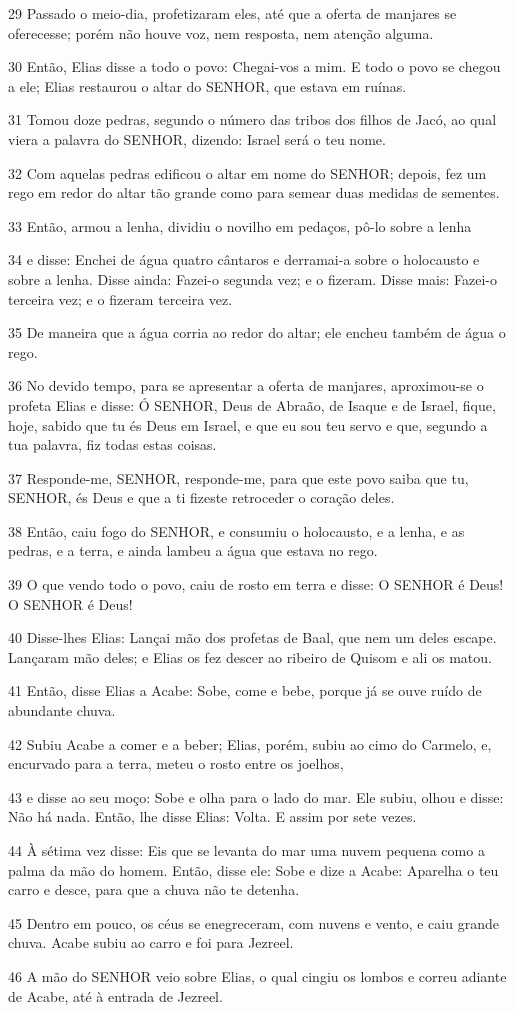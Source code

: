 \par 29 Passado o meio-dia, profetizaram eles, até que a oferta de manjares se oferecesse; porém não houve voz, nem resposta, nem atenção alguma.
\par 30 Então, Elias disse a todo o povo: Chegai-vos a mim. E todo o povo se chegou a ele; Elias restaurou o altar do SENHOR, que estava em ruínas.
\par 31 Tomou doze pedras, segundo o número das tribos dos filhos de Jacó, ao qual viera a palavra do SENHOR, dizendo: Israel será o teu nome.
\par 32 Com aquelas pedras edificou o altar em nome do SENHOR; depois, fez um rego em redor do altar tão grande como para semear duas medidas de sementes.
\par 33 Então, armou a lenha, dividiu o novilho em pedaços, pô-lo sobre a lenha
\par 34 e disse: Enchei de água quatro cântaros e derramai-a sobre o holocausto e sobre a lenha. Disse ainda: Fazei-o segunda vez; e o fizeram. Disse mais: Fazei-o terceira vez; e o fizeram terceira vez.
\par 35 De maneira que a água corria ao redor do altar; ele encheu também de água o rego.
\par 36 No devido tempo, para se apresentar a oferta de manjares, aproximou-se o profeta Elias e disse: Ó SENHOR, Deus de Abraão, de Isaque e de Israel, fique, hoje, sabido que tu és Deus em Israel, e que eu sou teu servo e que, segundo a tua palavra, fiz todas estas coisas.
\par 37 Responde-me, SENHOR, responde-me, para que este povo saiba que tu, SENHOR, és Deus e que a ti fizeste retroceder o coração deles.
\par 38 Então, caiu fogo do SENHOR, e consumiu o holocausto, e a lenha, e as pedras, e a terra, e ainda lambeu a água que estava no rego.
\par 39 O que vendo todo o povo, caiu de rosto em terra e disse: O SENHOR é Deus! O SENHOR é Deus!
\par 40 Disse-lhes Elias: Lançai mão dos profetas de Baal, que nem um deles escape. Lançaram mão deles; e Elias os fez descer ao ribeiro de Quisom e ali os matou.
\par 41 Então, disse Elias a Acabe: Sobe, come e bebe, porque já se ouve ruído de abundante chuva.
\par 42 Subiu Acabe a comer e a beber; Elias, porém, subiu ao cimo do Carmelo, e, encurvado para a terra, meteu o rosto entre os joelhos,
\par 43 e disse ao seu moço: Sobe e olha para o lado do mar. Ele subiu, olhou e disse: Não há nada. Então, lhe disse Elias: Volta. E assim por sete vezes.
\par 44 À sétima vez disse: Eis que se levanta do mar uma nuvem pequena como a palma da mão do homem. Então, disse ele: Sobe e dize a Acabe: Aparelha o teu carro e desce, para que a chuva não te detenha.
\par 45 Dentro em pouco, os céus se enegreceram, com nuvens e vento, e caiu grande chuva. Acabe subiu ao carro e foi para Jezreel.
\par 46 A mão do SENHOR veio sobre Elias, o qual cingiu os lombos e correu adiante de Acabe, até à entrada de Jezreel.

